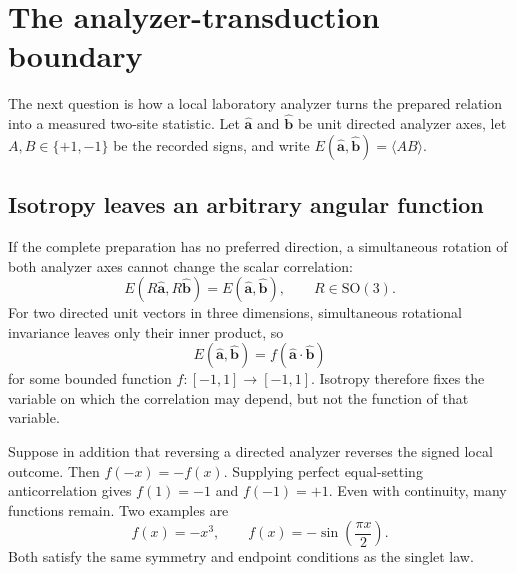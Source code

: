 \documentclass[11pt]{article}
\theoremstyle{remark}
\newcommand{\SO}{\mathrm{SO}(3)}
\newcommand{\ahat}{\hat{\bm a}}
\newcommand{\bhat}{\hat{\bm b}}
\begin{document}
\section{The analyzer-transduction boundary}
\label{sec:analyzer}

The next question is how a local laboratory analyzer turns the prepared relation into a measured
two-site statistic.  Let \(\ahat\) and \(\bhat\) be unit directed analyzer axes, let
\(A,B\in\{+1,-1\}\) be the recorded signs, and write \(E(\ahat,\bhat)=\langle AB\rangle\).

\subsection{Isotropy leaves an arbitrary angular function}

If the complete preparation has no preferred direction, a simultaneous rotation of both analyzer
axes cannot change the scalar correlation:
\begin{equation}
  E(R\ahat,R\bhat)=E(\ahat,\bhat),
  \qquad R\in\SO.
  \label{eq:rotational_E}
\end{equation}
For two directed unit vectors in three dimensions, simultaneous rotational invariance leaves only their inner product, so
\begin{equation}
  \boxed{E(\ahat,\bhat)=f(\ahat\cdot\bhat)}
  \label{eq:general_f}
\end{equation}
for some bounded function \(f:[-1,1]\to[-1,1]\).  Isotropy therefore fixes the variable on which the
correlation may depend, but not the function of that variable.

Suppose in addition that reversing a directed analyzer reverses the signed local outcome.  Then
\(f(-x)=-f(x)\).  Supplying perfect equal-setting anticorrelation gives \(f(1)=-1\) and
\(f(-1)=+1\).  Even with continuity, many functions remain.  Two examples are
\begin{equation}
  f(x)=-x^3,
  \qquad
  f(x)=-\sin\!\left(\frac{\pi x}{2}\right).
  \label{eq:counterexamples}
\end{equation}
Both satisfy the same symmetry and endpoint conditions as the singlet law.
\end{document}
